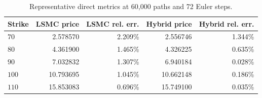 \begin{table}[htbp]
\centering
\caption{Representative direct metrics at 60,000 paths and 72 Euler steps.}
\label{tab:bgk_r02_calibrated_t1_nex12-step72-60k}
\begin{tabular}{lrrrr}
\toprule
Strike & LSMC price & LSMC rel. err. & Hybrid price & Hybrid rel. err. \\
\midrule
$70$ & 2.578570 & 2.209\% & 2.556746 & 1.344\% \\
$80$ & 4.361900 & 1.465\% & 4.326225 & 0.635\% \\
$90$ & 7.032832 & 1.307\% & 6.940184 & 0.028\% \\
$100$ & 10.793695 & 1.045\% & 10.662148 & 0.186\% \\
$110$ & 15.853083 & 0.696\% & 15.749100 & 0.035\% \\
\bottomrule
\end{tabular}
\end{table}
